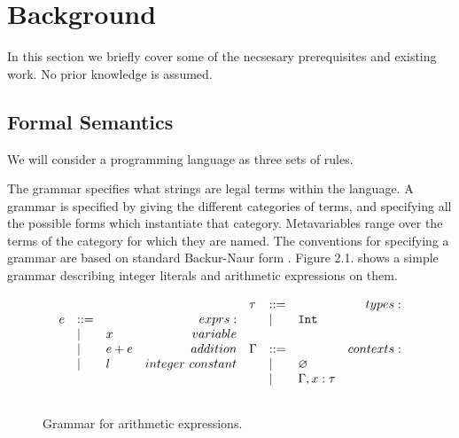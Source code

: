 \chapter{Background}\label{C:background}

In this section we briefly cover some of the necsesary prerequisites and existing work. No prior knowledge is assumed.

\section{Formal Semantics}

\noindent
We will consider a programming language as three sets of rules.

The grammar specifies what strings are legal terms within the language. A grammar is specified by giving the different categories of terms, and specifying all the possible forms which instantiate that category. Metavariables range over the terms of the category for which they are named. The conventions for specifying a grammar are based on standard Backur-Naur form \cite{bnf}. Figure 2.1. shows a simple grammar describing integer literals and arithmetic expressions on them.

\begin{figure}[h]

\[
\begin{array}{c}

\begin{array}{lllr}

e & ::= & ~ & exprs: \\
	& | & x & variable \\
	& | & e + e & addition \\
	& | & l & integer~constant \\
	&&\\

\end{array}

\begin{array}{lllr}

\tau & ::= & ~ & types: \\
	& | & \mathtt{Int} \\
	&&\\
	
\Gamma & ::= & ~ & contexts: \\
	& | & \varnothing \\
	& | & \Gamma, x: \tau \\
	&&\\

\end{array}

\end{array}
\]

\vspace{-7pt}
\caption{Grammar for arithmetic expressions.}
\label{A sample. }
\end{figure}

